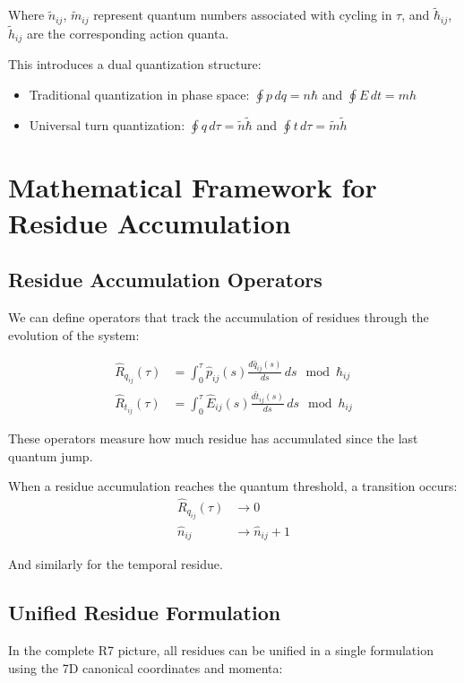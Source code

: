 \documentclass{article}
\begin{document}
Where $\tilde{n}_{ij}$, $\tilde{m}_{ij}$ represent quantum numbers associated with cycling in $\tau$, and $\tilde{\hbar}_{ij}$, $\tilde{h}_{ij}$ are the corresponding action quanta.

This introduces a dual quantization structure:
\begin{itemize}
\item Traditional quantization in phase space: $\oint p \, dq = n\hbar$ and $\oint E \, dt = mh$
\item Universal turn quantization: $\oint q \, d\tau = \tilde{n}\tilde{\hbar}$ and $\oint t \, d\tau = \tilde{m}\tilde{h}$
\end{itemize}

\section{Mathematical Framework for Residue Accumulation}

\subsection{Residue Accumulation Operators}

We can define operators that track the accumulation of residues through the evolution of the system:

\begin{align}
\hat{R}_{q_{ij}}(\tau) &= \int_0^\tau \hat{p}_{ij}(s) \frac{d\hat{q}_{ij}(s)}{ds} \, ds \mod \hbar_{ij} \\
\hat{R}_{t_{ij}}(\tau) &= \int_0^\tau \hat{E}_{ij}(s) \frac{d\hat{t}_{ij}(s)}{ds} \, ds \mod h_{ij}
\end{align}

These operators measure how much residue has accumulated since the last quantum jump.

When a residue accumulation reaches the quantum threshold, a transition occurs:
\begin{align}
\hat{R}_{q_{ij}}(\tau) &\to 0 \\
\hat{n}_{ij} &\to \hat{n}_{ij} + 1
\end{align}

And similarly for the temporal residue.

\subsection{Unified Residue Formulation}

In the complete R7 picture, all residues can be unified in a single formulation using the 7D canonical coordinates and momenta:
\end{document}

